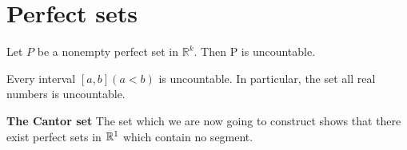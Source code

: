 \section{Perfect sets}


\begin{thm}\label{thm:2.43}
    Let $P$ be a nonempty perfect set in $\mathbb{R}^k$. Then P is uncountable.    
\end{thm}





\begin{myCorollary}
	Every interval $[a, b] (a <b)$ is uncountable. In particular, the set
	all real numbers is uncountable.
\end{myCorollary}


\begin{myDef}
	\textbf{The Cantor set} The set which we are now going to construct shows
	that there exist perfect sets in ${\protect\mathbb R}^{1}$ which contain no segment.
\end{myDef}


